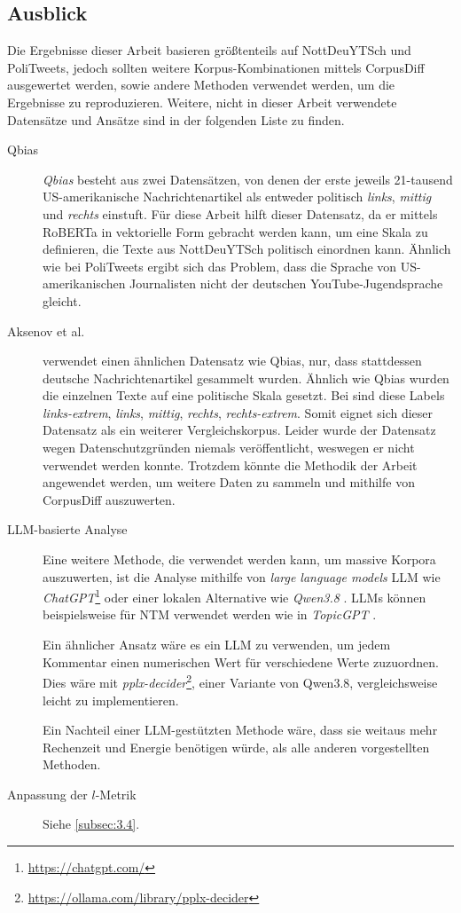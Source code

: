 \subsection{Ausblick} \label{subsec:4.1}
Die Ergebnisse dieser Arbeit basieren größtenteils auf NottDeuYTSch und PoliTweets, jedoch sollten weitere Korpus-Kombinationen mittels CorpusDiff ausgewertet werden, sowie andere Methoden verwendet werden, um die Ergebnisse zu reproduzieren.
Weitere, nicht in dieser Arbeit verwendete Datensätze und Ansätze sind in der folgenden Liste zu finden.
\begin{description}
    \item[Qbias] \emph{Qbias} \autocite{HS23} besteht aus zwei Datensätzen, von denen der erste jeweils 21-tausend US-amerikanische Nachrichtenartikel als entweder politisch \emph{links}, \emph{mittig} und \emph{rechts} einstuft.
        Für diese Arbeit hilft dieser Datensatz, da er mittels RoBERTa in vektorielle Form gebracht werden kann, um eine Skala zu definieren, die Texte aus NottDeuYTSch politisch einordnen kann.
        Ähnlich wie bei PoliTweets ergibt sich das Problem, dass die Sprache von US-amerikanischen Journalisten nicht der deutschen YouTube-Jugendsprache gleicht.

    \item[Aksenov et al.] \textcite{Aks21} verwendet einen ähnlichen Datensatz wie Qbias, nur, dass stattdessen deutsche Nachrichtenartikel gesammelt wurden.
        Ähnlich wie Qbias wurden die einzelnen Texte auf eine politische Skala gesetzt.
        Bei \textcite{Aks21} sind diese Labels \emph{links-extrem}, \emph{links}, \emph{mittig}, \emph{rechts}, \emph{rechts-extrem}.
        Somit eignet sich dieser Datensatz als ein weiterer Vergleichskorpus.
        Leider wurde der Datensatz wegen Datenschutzgründen niemals veröffentlicht, weswegen er nicht verwendet werden konnte.
        Trotzdem könnte die Methodik der Arbeit angewendet werden, um weitere Daten zu sammeln und mithilfe von CorpusDiff auszuwerten.

    \item[LLM-basierte Analyse] Eine weitere Methode, die verwendet werden kann, um massive Korpora auszuwerten, ist die Analyse mithilfe von \emph{large language models} LLM wie \emph{ChatGPT}\footnote{\url{https://chatgpt.com/}} oder einer lokalen Alternative wie \emph{Qwen3.8} \autocite{Qi26}.
        LLMs können beispielsweise für NTM verwendet werden wie in \emph{TopicGPT} \autocite{Pham24}.

        Ein ähnlicher Ansatz wäre es ein LLM zu verwenden, um jedem Kommentar einen numerischen Wert für verschiedene Werte zuzuordnen.
        Dies wäre mit \emph{pplx-decider}\footnote{\url{https://ollama.com/library/pplx-decider}}, einer Variante von Qwen3.8, vergleichsweise leicht zu implementieren.

        Ein Nachteil einer LLM-gestützten Methode wäre, dass sie weitaus mehr Rechenzeit und Energie benötigen würde, als alle anderen vorgestellten Methoden.

    \item[Anpassung der \(l\)-Metrik] Siehe \autoref{subsec:3.4}.

\end{description}

